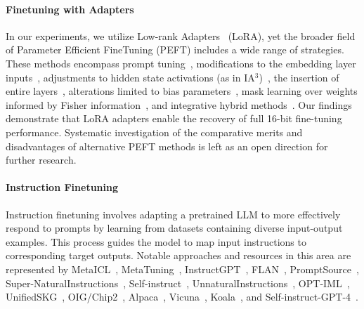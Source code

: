 \paragraph{Finetuning with Adapters} In our experiments, we utilize Low-rank Adapters~\citep{hu2021lora} (LoRA), yet the broader field of Parameter Efficient FineTuning (PEFT) includes a wide range of strategies. These methods encompass prompt tuning~\citep{qin2021learning,lester2021power,li2021prefix}, modifications to the embedding layer inputs~\citep{an2022input}, adjustments to hidden state activations (as in IA$^3$)~\citep{liu2022few}, the insertion of entire layers~\citep{houlsby2019parameter}, alterations limited to bias parameters~\citep{zaken2021bitfit}, mask learning over weights informed by Fisher information~\citep{sung2021training}, and integrative hybrid methods~\citep{henderson2021compacter}. Our findings demonstrate that LoRA adapters enable the recovery of full 16-bit fine-tuning performance. Systematic investigation of the comparative merits and disadvantages of alternative PEFT methods is left as an open direction for further research.

\paragraph{Instruction Finetuning} Instruction finetuning involves adapting a pretrained LLM to more effectively respond to prompts by learning from datasets containing diverse input-output examples. This process guides the model to map input instructions to corresponding target outputs. Notable approaches and resources in this area are represented by MetaICL~\citep{min2021metaicl}, MetaTuning~\citep{zhong2021adapting}, InstructGPT~\citep{ouyang2022training}, FLAN~\citep{wei2021finetuned,chung2022scaling}, PromptSource~\citep{bach2022promptsource}, Super-NaturalInstructions~\citep{wang2022super,sanh2021multitask}, Self-instruct~\citep{wang2022self}, UnnaturalInstructions~\citep{honovich2022unnatural}, OPT-IML~\citep{iyer2022opt}, UnifiedSKG~\citep{xie2022unifiedskg}, OIG/Chip2~\citep{laion2023}, Alpaca~\citep{alpaca}, Vicuna~\citep{vicuna2023}, Koala~\citep{koala_blogpost_2023}, and Self-instruct-GPT-4~\citep{peng2023instruction}.

